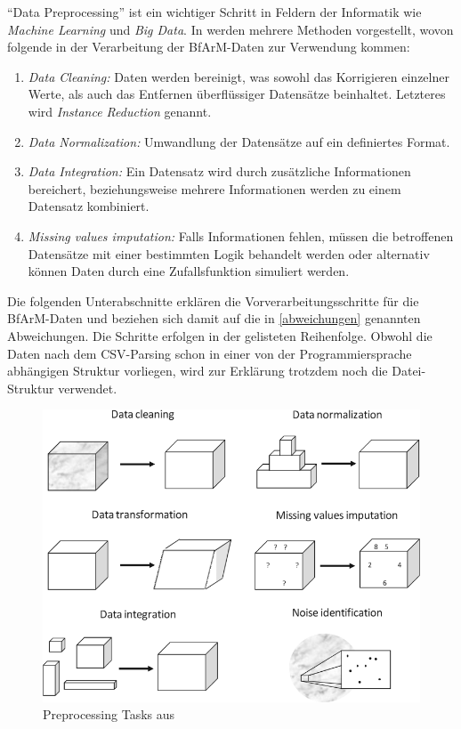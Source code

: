 ``Data Preprocessing'' ist ein wichtiger Schritt in Feldern der Informatik wie \emph{Machine Learning} und \emph{Big Data}. In \citep{garcia2016big} werden mehrere Methoden vorgestellt, wovon folgende in der Verarbeitung der BfArM-Daten zur Verwendung kommen:

\begin{enumerate}
\item \emph{Data Cleaning:} Daten werden bereinigt, was sowohl das Korrigieren einzelner Werte, als auch das Entfernen überflüssiger Datensätze beinhaltet. Letzteres wird \emph{Instance Reduction} genannt. 
\item \emph{Data Normalization:} Umwandlung der Datensätze auf ein definiertes Format. 
\item \emph{Data Integration:} Ein Datensatz wird durch zusätzliche Informationen bereichert, beziehungsweise mehrere Informationen werden zu einem Datensatz kombiniert. 
\item \emph{Missing values imputation:} Falls Informationen fehlen, müssen die betroffenen Datensätze mit einer bestimmten Logik behandelt werden oder alternativ können Daten durch eine Zufallsfunktion simuliert werden. 
\end{enumerate}

Die folgenden Unterabschnitte erklären die Vorverarbeitungsschritte für die BfArM-Daten und beziehen sich damit auf die in \ref{abweichungen} genannten Abweichungen. Die Schritte erfolgen in der gelisteten Reihenfolge. Obwohl die Daten nach dem CSV-Parsing schon in einer von der Programmiersprache abhängigen Struktur vorliegen, wird zur Erklärung trotzdem noch die Datei-Struktur verwendet.

\begin{figure}[H]
    \centering
    \includegraphics[width=.7\linewidth]{../img/data-preproc.png}
    \caption{Preprocessing Tasks aus \citep[Seite 4]{garcia2016big}}
\end{figure}


